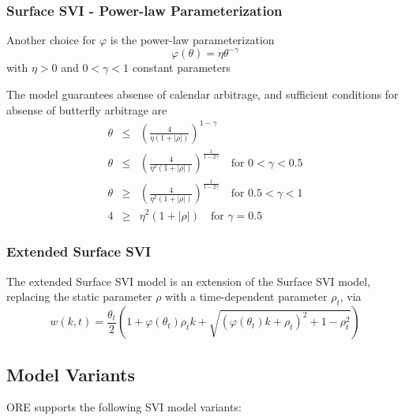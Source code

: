 \documentclass{amsart}
\theoremstyle{plain}
\numberwithin{equation}{section}
\begin{document}
\subsubsection{Surface SVI - Power-law Parameterization}\label{sec:ssvi_power_law}

Another choice for $\varphi$ is the power-law parameterization
\begin{equation}
\varphi(\theta) = \eta \theta^{-\gamma}
\end{equation}
with $\eta > 0$ and $0 < \gamma < 1$ constant parameters

The model guarantees absense of calendar arbitrage, and sufficient conditions for absense of butterfly arbitrage are
\begin{eqnarray}
\theta &\le& \left(\frac{4}{\eta (1 + |\rho|)}\right)^{1-\gamma}  \\
\theta &\le& \left(\frac{4}{\eta^2 (1 + |\rho|)}\right)^{\frac{1}{1-2\gamma}} \quad \text{for } 0<\gamma<0.5 \\
\theta &\ge& \left(\frac{4}{\eta^2 (1 + |\rho|)}\right)^{\frac{1}{1-2\gamma}} \quad \text{for } 0.5<\gamma<1 \\
4 &\ge& \eta^2 (1 + |\rho|) \quad \text{for } \gamma=0.5
\end{eqnarray}

\subsubsection{Extended Surface SVI}\cite{Hendriks_2017}\label{sec:essvi}

The extended Surface SVI model is an extension of the Surface SVI model, replacing the static parameter $\rho$ with a time-dependent parameter
$\rho_t$, via
\begin{equation}
w(k,t) = \frac{\theta_t}{2} \left( 1 + \varphi(\theta_t) \rho_t k + \sqrt{(\varphi(\theta_t) k + \rho_t)^2 + 1 - \rho_t^2} \right)
\end{equation}

\subsection{Model Variants}

ORE supports the following SVI model variants:
\end{document}
